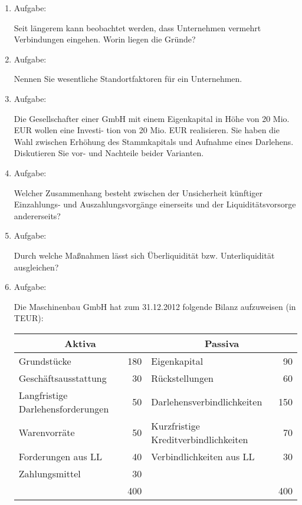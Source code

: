 \documentclass[12pt,a4paper]{scrreprt}
\begin{document}
\begin{enumerate}
 	\item{Aufgabe:}

Seit längerem kann beobachtet werden, dass Unternehmen vermehrt Verbindungen eingehen. Worin
liegen die Gründe?

 	\item{Aufgabe:}

Nennen Sie wesentliche Standortfaktoren für ein Unternehmen.

 	\item{Aufgabe:}

Die Gesellschafter einer GmbH mit einem Eigenkapital in Höhe von 20 Mio. EUR wollen eine Investi-
tion von 20 Mio. EUR realisieren. Sie haben die Wahl zwischen Erhöhung des Stammkapitals und
Aufnahme eines Darlehens. Diskutieren Sie vor- und Nachteile beider Varianten.

 	\item{Aufgabe:}

Welcher Zusammenhang besteht zwischen der Unsicherheit künftiger Einzahlungs-
und Auszahlungsvorgänge einerseits und der Liquiditätsvorsorge andererseits?

 	\item{Aufgabe:}

Durch welche Maßnahmen lässt sich Überliquidität bzw. Unterliquidität ausgleichen?

 	\item{Aufgabe:}

Die Maschinenbau GmbH hat zum 31.12.2012 folgende Bilanz aufzuweisen (in TEUR):

\begin{tabular}{|lr|lr|}
\hline \multicolumn{2}{|c|}{Aktiva} & \multicolumn{2}{|c|}{Passiva} \\\hline
Grundstücke & 180 & Eigenkapital & 90 \\\hline
Geschäftsausstattung & 30 & Rückstellungen & 60 \\\hline
Langfristige Darlehensforderungen & 50 & Darlehensverbindlichkeiten & 150 \\\hline
Warenvorräte & 50 & Kurzfristige Kreditverbindlichkeiten & 70 \\\hline
Forderungen aus LL & 40 & Verbindlichkeiten aus LL & 30 \\\hline
Zahlungsmittel & 30 &  \multicolumn{2}{|l|}{} \\\hline
 \multicolumn{2}{|r|}{400} & \multicolumn{2}{|r|}{400} \\\hline
\end{tabular}


\end{enumerate}
\end{document}
